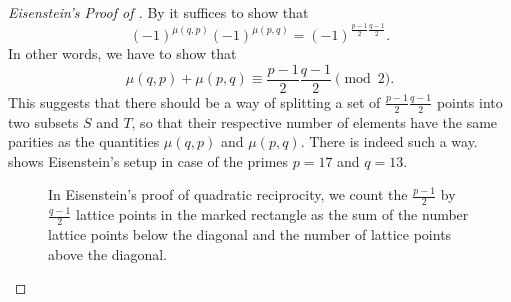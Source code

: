 \begin{proof}[Eisenstein's Proof of ]
  By  it suffices to show that
  \begin{equation*}
    (-1)^{\mu(q,p)}(-1)^{\mu(p,q)}=(-1)^{\frac{p-1}{2}\frac{q-1}{2}}.
  \end{equation*}
  In other words, we have to show that
  \begin{equation*}
    \mu(q,p)+\mu(p,q)\equiv \frac{p-1}{2}\frac{q-1}{2}\pmod{2}.
  \end{equation*}
  This suggests that there should be a way of splitting a set of $\frac{p-1}{2}\frac{q-1}{2}$ points into two subsets $S$ and $T$, so that their respective number of elements have the same parities as the quantities $\mu(q,p)$ and $\mu(p,q)$. There is indeed such a way.  shows Eisenstein's setup in case of the primes $p=17$ and $q=13$. 
  
  \begin{figure}[t]
    \centering
    \caption[Eisenstein's proof of quadratic reciprocity]{\label{figure:eisenstein-quadratic-reciprocity}In Eisenstein's proof of quadratic reciprocity, we count the $\frac{p-1}{2}$ by $\frac{q-1}{2}$ lattice points in the marked rectangle as the sum of the number lattice points below the diagonal and the number of lattice points above the diagonal.}
  \end{figure}  
  

\end{proof}
